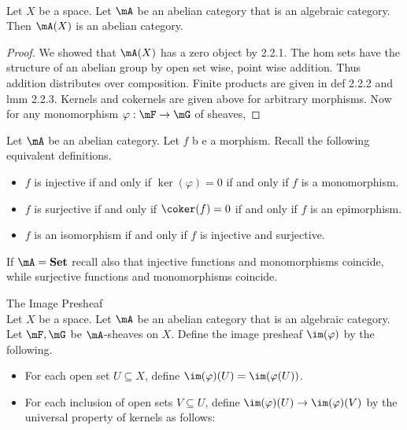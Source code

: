 \documentclass[a4paper]{article}
\begin{document}
\begin{prp}{}{}\\
Let $X$ be a space. Let $\mA$ be an abelian category that is an algebraic category. Then $\mA(X)$ is an abelian category. 
\begin{proof}
We showed that $\mA(X)$ has a zero object by 2.2.1. The hom sets have the structure of an abelian group by open set wise, point wise addition. Thus addition distributes over composition. Finite products are given in def 2.2.2 and lmm 2.2.3. Kernels and cokernels are given above for arbitrary morphisms. Now for any monomorphism $\varphi:\mF\to\mG$ of sheaves, 
\end{proof}
\end{prp}

Let $\mA$ be an abelian category. Let $f$ b e a morphism. Recall the following equivalent definitions. 
\begin{itemize}
\item $f$ is injective if and only if $\ker(\varphi)=0$ if and only if $f$ is a monomorphism. 
\item $f$ is surjective if and only if $\coker(f)=0$ if and only if $f$ is an epimorphism. 
\item $f$ is an isomorphism if and only if $f$ is injective and surjective. 
\end{itemize}
If $\mA=\bold{Set}$ recall also that injective functions and monomorphisms coincide, while surjective functions and monomorphisms coincide. 

\begin{defn}{The Image Presheaf}{}\\
Let $X$ be a space. Let $\mA$ be an abelian category that is an algebraic category. Let $\mF,\mG$ be $\mA$-sheaves on $X$. Define the image presheaf $\im(\varphi)$ by the following. 
\begin{itemize}
\item For each open set $U\subseteq X$, define $\im(\varphi)(U)=\im(\varphi(U))$. 
\item For each inclusion of open sets $V\subseteq U$, define $\im(\varphi)(U)\to\im(\varphi)(V)$ by the universal property of kernels as follows: \\
 \\~\\
\end{itemize}
\end{defn}
\end{document}
